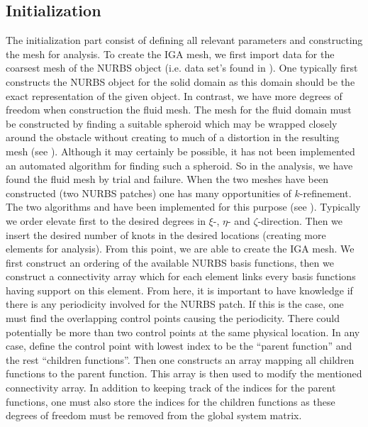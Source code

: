 \subsection{Initialization}
The initialization part consist of defining all relevant parameters and constructing the mesh for analysis. To create the IGA mesh, we first import data for the coarsest mesh of the NURBS object (i.e. data set's found in ). One typically first constructs the NURBS object for the solid domain as this domain should be the exact representation of the given object. In contrast, we have more degrees of freedom when construction the fluid mesh. The mesh for the fluid domain must be constructed by finding a suitable spheroid which may be wrapped closely around the obstacle without creating to much of a distortion in the resulting mesh (see ). Although it may certainly be possible, it has not been implemented an automated algorithm for finding such a spheroid. So in the analysis, we have found the fluid mesh by trial and failure. When the two meshes have been constructed (two NURBS patches) one has many opportunities of $k$-refinement. The two algorithms  and  have been implemented for this purpose (see ). Typically we order elevate first to the desired degrees in $\xi$-, $\eta$- and $\zeta$-direction. Then we insert the desired number of knots in the desired locations (creating more elements for analysis). From this point, we are able to create the IGA mesh. We first construct an ordering of the available NURBS basis functions, then we construct a connectivity array which for each element links every basis functions having support on this element. From here, it is important to have knowledge if there is any periodicity involved for the NURBS patch. If this is the case, one must find the overlapping control points causing the periodicity. There could potentially be more than two control points at the same physical location. In any case, define the control point with lowest index to be the ``parent function'' and the rest ``children functions''. Then one constructs an array mapping all children functions to the parent function. This array is then used to modify the mentioned connectivity array. In addition to keeping track of the indices for the parent functions, one must also store the indices for the children functions as these degrees of freedom must be removed from the global system matrix.

